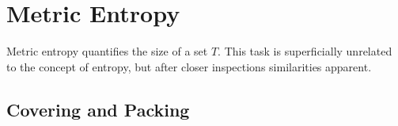 \documentclass[12pt, twoside]{article}
\newcommand{\1}{\mathbb{1}}
\begin{document}
\section{Metric Entropy}
Metric entropy quantifies the size of a set $T$. This task is superficially unrelated to the concept of entropy, but after closer inspections similarities apparent.

\subsection{Covering and Packing}


\clearpage
 
{}
\nocite{maierhoferCoFD}

\end{document}
